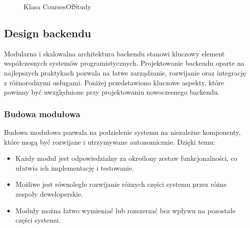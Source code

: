 \begin{figure}[H]
	\centering
	\caption{Klasa CoursesOfStudy}
	\label{fig:class-coursesofstudy}
\end{figure}

\subsection{Design backendu}
Modularna i skalowalna architektura backendu stanowi kluczowy element współczesnych systemów programistycznych. Projektowanie backendu oparte na najlepszych praktykach pozwala na łatwe zarządzanie, rozwijanie oraz integrację z różnorodnymi usługami. Poniżej przedstawiono kluczowe aspekty, które powinny być uwzględnione przy projektowaniu nowoczesnego backendu.

\subsubsection{Budowa modułowa}
Budowa modułowa pozwala na podzielenie systemu na niezależne komponenty, które mogą być rozwijane i utrzymywane autonomicznie. Dzięki temu:
\begin{itemize}
	\item Każdy moduł jest odpowiedzialny za określony zestaw funkcjonalności, co ułatwia ich implementację i testowanie.
	\item Możliwe jest równoległe rozwijanie różnych części systemu przez różne zespoły deweloperskie.
	\item Moduły można łatwo wymieniać lub rozszerzać bez wpływu na pozostałe części systemu.
\end{itemize}

